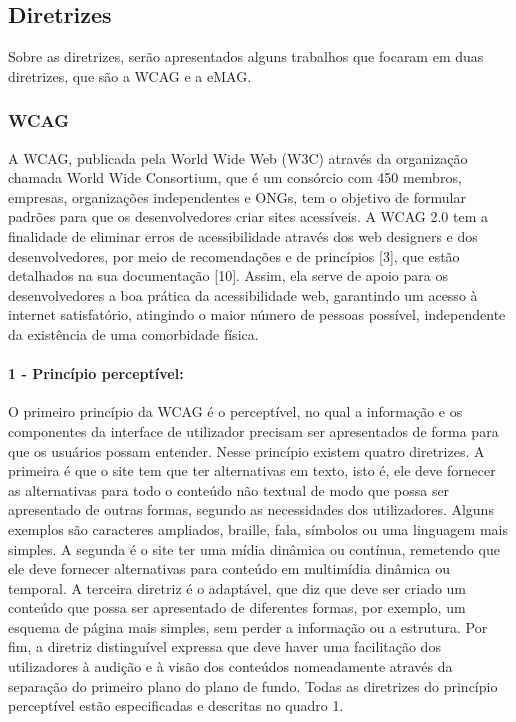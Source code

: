 \documentclass[a4paper]{article}
\begin{document}
\begin{titlepage}
\subsection{Diretrizes}
Sobre as diretrizes, serão apresentados alguns trabalhos que focaram em duas diretrizes, que são a WCAG e a eMAG.

\subsubsection{WCAG}

A WCAG, publicada pela World Wide Web (W3C) através da organização chamada World Wide Consortium, que é um consórcio com 450 membros, empresas, organizações independentes e ONGs, tem o objetivo de formular padrões para que os desenvolvedores criar sites acessíveis. A WCAG 2.0 tem a finalidade de eliminar erros de acessibilidade através dos web designers e dos desenvolvedores, por meio de recomendações e de princípios [3], que estão detalhados na sua documentação [10]. Assim, ela serve de apoio para os desenvolvedores a boa prática da acessibilidade web, garantindo um acesso à internet satisfatório, atingindo o maior número de pessoas possível, independente da existência de uma comorbidade física.

\paragraph{1 - Princípio perceptível:}

O primeiro princípio da WCAG é o perceptível, no qual a informação e os componentes da interface de utilizador precisam ser apresentados de forma para que os usuários possam entender. Nesse princípio existem quatro diretrizes. A primeira é que o site tem que ter alternativas em texto, isto é, ele deve fornecer as alternativas para todo o conteúdo não textual de modo que possa ser apresentado de outras formas, segundo as necessidades dos utilizadores. Alguns exemplos são caracteres ampliados, braille, fala, símbolos ou uma linguagem mais simples. A segunda é o site ter uma mídia dinâmica ou contínua, remetendo que ele deve fornecer alternativas para conteúdo em multimídia dinâmica ou temporal. A terceira diretriz é o adaptável, que diz que deve ser criado um conteúdo que possa ser apresentado de diferentes formas, por exemplo, um esquema de página mais simples, sem perder a informação ou a estrutura. Por fim, a diretriz distinguível expressa que deve haver uma facilitação dos utilizadores à audição e à visão dos conteúdos nomeadamente através da separação do primeiro plano do plano de fundo. Todas as diretrizes do princípio perceptível estão especificadas e descritas no quadro 1.


\end{titlepage}
\end{document}
